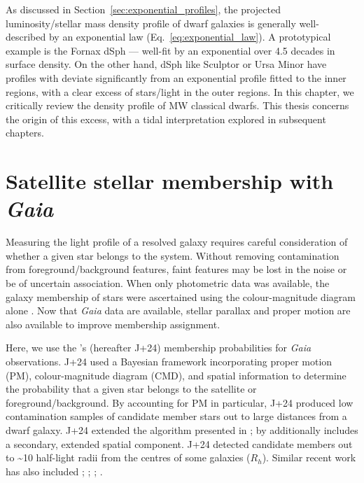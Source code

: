 As discussed in Section~\ref{sec:exponential_profiles}, the projected
luminosity/stellar mass density profile of dwarf galaxies is generally
well-described by an exponential law (Eq.~\ref{eq:exponential_law}). A
prototypical example is the Fornax dSph --- well-fit by an exponential
over 4.5 decades in surface density. On the other hand, dSph like
Sculptor or Ursa Minor have profiles with deviate significantly from an
exponential profile fitted to the inner regions, with a clear excess of
stars/light in the outer regions. In this chapter, we critically review
the density profile of MW classical dwarfs. This thesis concerns the
origin of this excess, with a tidal interpretation explored in
subsequent chapters.

\section{\texorpdfstring{Satellite stellar membership with
\emph{Gaia}}{Satellite stellar membership with Gaia}}\label{satellite-stellar-membership-with-gaia}

Measuring the light profile of a resolved galaxy requires careful
consideration of whether a given star belongs to the system. Without
removing contamination from foreground/background features, faint
features may be lost in the noise or be of uncertain association. When
only photometric data was available, the galaxy membership of stars were
ascertained using the colour-magnitude diagram alone \citep[e.g.,
matched filter methods like][]{rockosi+2002}. Now that \emph{Gaia} data
are available, stellar parallax and proper motion are also available to
improve membership assignment.

Here, we use the \citet{jensen+2024}'s (hereafter J+24) membership
probabilities for \emph{Gaia} observations. J+24 used a Bayesian
framework incorporating proper motion (PM), colour-magnitude diagram
(CMD), and spatial information to determine the probability that a given
star belongs to the satellite or foreground/background. By accounting
for PM in particular, J+24 produced low contamination samples of
candidate member stars out to large distances from a dwarf galaxy. J+24
extended the algorithm presented in \citet{MV2020a}; \citet{MV2020b} by
additionally includes a secondary, extended spatial component. J+24
detected candidate members out to \textasciitilde10 half-light radii
from the centres of some galaxies (\(R_h\)). Similar recent work has
also included \citet{pace+li2019}; \citet{battaglia+2022};
\citet{pace+erkal+li2022}; \citet{qi+2022}.

